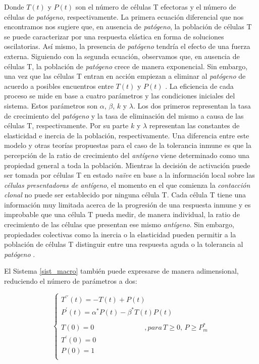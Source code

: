 Donde $T(t)$ y $P(t)$ son el número de células T efectoras y el número de células de \textit{patógeno}, respectivamente. La primera ecuación diferencial que nos encontramos nos sugiere que, en ausencia de \textit{patógeno}, la población de células T se puede caracterizar por una respuesta elástica en forma de soluciones oscilatorias. Así mismo, la presencia de \textit{patógeno} tendría el efecto de una fuerza externa. Siguiendo con la segunda ecuación, observamos que, en ausencia de células T, la población de \textit{patógeno} crece de manera exponencial. Sin embargo, una vez que las células T entran en acción empiezan a eliminar al \textit{patógeno} de acuerdo a posibles encuentros entre $T(t)$ y $P(t)$ \citep{arias2016emergent}. La eficiencia de cada proceso se mide en base a cuatro parámetros y las condiciones iniciales del sistema. Estos parámetros son $\alpha$, $\beta$, $k$ y $\lambda$. Los dos primeros representan la tasa de crecimiento del \textit{patógeno} y la tasa de eliminación del mismo a causa de las células T, respectivamente. Por su parte $k$ y $\lambda$ representan las constantes de elasticidad e inercia de la población, respectivamente. Una diferencia entre este modelo y otras teorías propuestas para el caso de la tolerancia inmune es que la percepción de la ratio de crecimiento del \textit{antígeno} viene determinado como una propiedad general a toda la población. Mientras la decisión de activación puede ser tomada por células T en estado \textit{naïve} en base a la información local sobre las \textit{células presentadoras de antígeno}, el momento en el que comienza la \textit{contacción clonal} no puede ser establecido por ninguna célula T. Cada célula T tiene una información muy limitada acerca de la progresión de una respuesta inmune y es improbable que una célula T pueda medir, de manera individual, la ratio de crecimiento de las células que presentan ese mismo \textit{antígeno}. Sin embargo, propiedades colectivas como la inercia o la elasticidad pueden permitir a la población de células T distinguir entre una respuesta aguda o la tolerancia al \textit{patógeno} \citep{arias2015growth}.

El Sistema \ref{sist_macro} también puede expresarse de manera adimensional, reduciendo el número de parámetros a dos: 

\begin{equation}
	\label{sist_macro_nod}
	\left\{ \begin{array}{l}
	{T^{\prime\prime}}(t) = -T(t) + P(t) \\
	{P^{\prime}}(t) = \alpha^{*} P(t) - \beta^{*} T(t)P(t) \\
	\\
	T(0)=0 \hspace{3cm} ,para\, T \geq 0,\, P \geq P_m^{*} \\
	T^{\prime}(0)=0  \\
	P(0)=1 \\ 
	\end{array}
	\right.
\end{equation}

